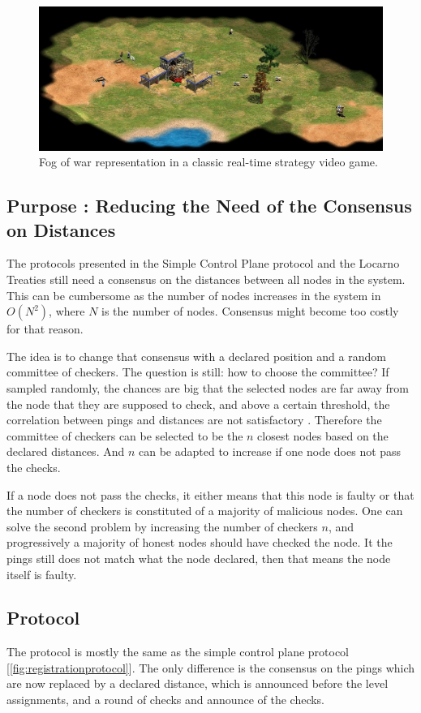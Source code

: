 \documentclass[a4paper,11pt,twoside,openright]{report}
\begin{document}
\begin{figure}[!h] 
\centering
\includegraphics[width=400pt]{figures/fog_of_war}
\caption{Fog of war representation in a classic real-time strategy video game. }
\label{fig:fog-of-the-war}
\end{figure}

\subsection{Purpose : Reducing the Need of the Consensus on Distances}
The protocols presented in the Simple Control Plane protocol and the Locarno
Treaties still need a consensus on the distances between all nodes in the system.
This can be cumbersome as the number of nodes increases in the system in $O(N^2)$, where $N$ is the number of nodes. Consensus
might become too costly for that reason.

The idea is to change that consensus with a declared position and a random
committee of checkers. The question is still: how to choose the committee? If
sampled randomly, the chances are big that the selected nodes are far away
from the node that they are supposed to check, and above a certain threshold,
the correlation between pings and distances are not satisfactory
\cite{Katz-bassett2006}. Therefore the committee of checkers can be selected to
be the $n$ closest nodes based on the declared distances. And $n$ can be
adapted to increase if one node does not pass the checks. 

If a node does not pass the checks, it either means that this node is faulty or
that the number of checkers is constituted of a majority of malicious nodes.
One can solve the second problem by increasing the number of checkers $n$, and
progressively a majority of honest nodes should have checked the node. It the
pings still does not match what the node declared, then that means the node itself is faulty. 

\subsection{Protocol}
The protocol is mostly the same as the simple control plane protocol
[\autoref{fig:registrationprotocol}]. The only difference is the consensus on
the pings which are now replaced by a declared distance, which is announced
before the level assignments,  and a round of checks and announce of the checks. 
\end{document}
